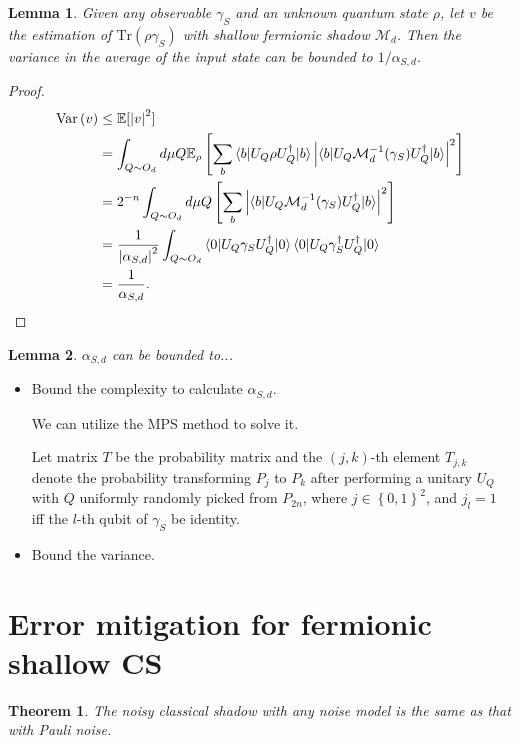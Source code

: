 \documentclass{article}
\newcommand{\abs}[1]{\left| #1 \right|}
\newcommand{\cbra}[1]{\left\{ #1 \right\}}
\newcommand{\sbra}[1]{\left[ #1 \right]}
\newcommand{\tr}[1]{\text{Tr}\left( #1 \right)}
\newcommand{\var}[1]{\text{Var}\left( #1 \right)}
\newtheorem{theorem}{Theorem}
\newtheorem{lemma}{Lemma}
\newcommand{\Mcal}{\mathcal{M}}
\newcommand{\Ebb}{\mathbb{E}}
\begin{document}
\begin{lemma}
Given any observable $\gamma_S$ and an unknown quantum state $\rho$, let $v$ be the estimation of $\tr{\rho \gamma_S}$ with shallow fermionic shadow $\Mcal_d$.
Then the variance in the average of the input state can be bounded to $1/\alpha_{S,d}.$
\end{lemma}

\begin{proof}

\begin{align}
\var{v} &\leq \Ebb[\abs{v}^2]\\
&= \int_{Q\sim O_d} d\mu Q
 \Ebb_{\rho}\sbra{\sum_b \braket{b|U_Q \rho U_Q^\dagger|b} \abs{\braket{b|U_Q \Mcal_d^{-1} (\gamma_S) U_Q^\dagger|b}}^2}\\
 &=2^{-n}\int_{Q\sim O_d} d\mu Q \sbra{\sum_b \abs{\braket{b|U_Q \Mcal_d^{-1} (\gamma_S) U_Q^\dagger|b}}^2}\\
 &=\frac{1}{\abs{\alpha_{S,d}}^2} \int_{Q\sim O_d}\braket{0|U_Q \gamma_S U_Q^\dagger|0}\braket{0|U_Q \gamma_S^\dagger U_Q^\dagger|0}\\
 &=\frac{1}{\alpha_{S,d}}.
 \end{align}
\end{proof}
\begin{lemma}
$\alpha_{S,d}$ can be bounded to...
\end{lemma}





\begin{itemize}
    \item Bound the complexity to calculate $\alpha_{S,d}$.

We can utilize the MPS method to solve it.

Let matrix $T$ be the probability matrix and the $(j,k)$-th element $T_{j,k}$ denote the probability transforming $P_{j}$ to $P_k$ after performing a unitary $U_Q$ with $Q$ uniformly randomly picked from $P_{2n}$, where $j\in \cbra{0,1}^2$, and $j_l=1$ iff the $l$-th qubit of $\gamma_{S}$ be identity.

    \item Bound the variance.
\end{itemize}

\section{Error mitigation for fermionic shallow CS}

\begin{theorem}
    The noisy classical shadow with any noise model is the same as that with Pauli noise.
\end{theorem}
\end{document}
